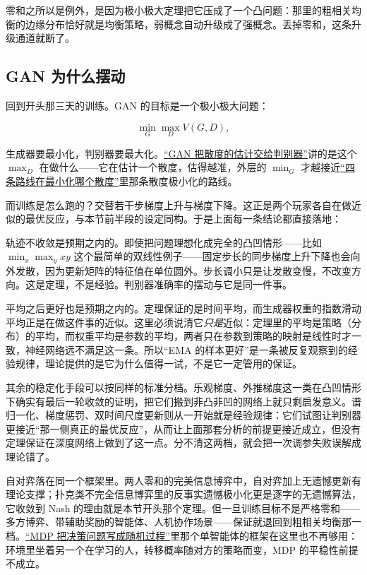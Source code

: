 零和之所以是例外，是因为极小极大定理把它压成了一个凸问题：那里的粗相关均衡的边缘分布恰好就是均衡策略，弱概念自动升级成了强概念。丢掉零和，这条升级通道就断了。

\subsection{GAN 为什么摆动}

回到开头那三天的训练。GAN 的目标是一个极小极大问题：

\[
\min_G\max_D V(G,D),
\]

生成器要最小化，判别器要最大化。\hyperref[sec:14-Deep-Learning/07-Generative-Models-Unified/03]{``GAN 把散度的估计交给判别器''}讲的是这个 \(\max_D\) 在做什么——它在估计一个散度，估得越准，外层的 \(\min_G\) 才越接近\hyperref[sec:14-Deep-Learning/07-Generative-Models-Unified/01]{``四条路线在最小化哪个散度''}里那条散度极小化的路线。

而训练是怎么跑的？交替若干步梯度上升与梯度下降。这正是两个玩家各自在做近似的最优反应，与本节前半段的设定同构。于是上面每一条结论都直接落地：

轨迹不收敛是预期之内的。即使把问题理想化成完全的凸凹情形——比如 \(\min_x\max_y xy\) 这个最简单的双线性例子——固定步长的同步梯度上升下降也会向外发散，因为更新矩阵的特征值在单位圆外。步长调小只是让发散变慢，不改变方向。这是定理，不是经验。判别器准确率的摆动与它是同一件事。

平均之后更好也是预期之内的。定理保证的是时间平均，而生成器权重的指数滑动平均正是在做这件事的近似。这里必须说清它\emph{只是}近似：定理里的平均是策略（分布）的平均，而权重平均是参数的平均，两者只在参数到策略的映射是线性时才一致，神经网络远不满足这一条。所以``EMA 的样本更好''是一条被反复观察到的经验规律，理论提供的是它为什么值得一试，不是它一定管用的保证。

其余的稳定化手段可以按同样的标准分档。乐观梯度、外推梯度这一类在凸凹情形下确实有最后一轮收敛的证明，把它们搬到非凸非凹的网络上就只剩启发意义。谱归一化、梯度惩罚、双时间尺度更新则从一开始就是经验规律：它们试图让判别器更接近``那一侧真正的最优反应''，从而让上面那套分析的前提更接近成立，但没有定理保证在深度网络上做到了这一点。分不清这两档，就会把一次调参失败误解成理论错了。

自对弈落在同一个框架里。两人零和的完美信息博弈中，自对弈加上无遗憾更新有理论支撑；扑克类不完全信息博弈里的反事实遗憾极小化更是逐字的无遗憾算法，它收敛到 Nash 的理由就是本节开头那个定理。但一旦训练目标不是严格零和——多方博弈、带辅助奖励的智能体、人机协作场景——保证就退回到粗相关均衡那一档。\hyperref[sec:16-Control-and-Reinforcement-Learning/02-Reinforcement-Learning/01]{``MDP 把决策问题写成随机过程''}里那个单智能体的框架在这里也不再够用：环境里坐着另一个在学习的人，转移概率随对方的策略而变，MDP 的平稳性前提不成立。

